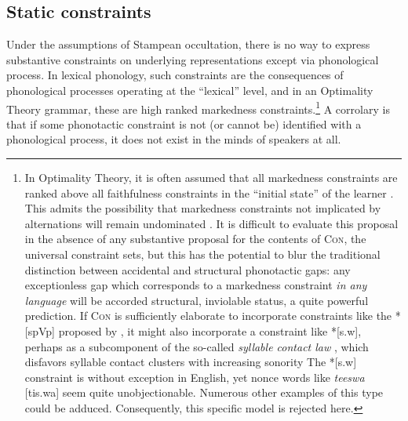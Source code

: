 \subsection{Static constraints}

Under the assumptions of Stampean occultation, there is no way to express substantive constraints on underlying representations except via phonological process.
In lexical phonology, such constraints are the consequences of phonological processes operating at the ``lexical'' level, and in an Optimality Theory grammar, these are high ranked markedness constraints.\footnote{In Optimality Theory, it is often assumed that all markedness constraints are ranked above all faithfulness constraints in the ``initial state'' of the learner \citep[e.g.,][]{Smolensky1996a}.
    This admits the possibility that markedness constraints not implicated by alternations will remain undominated \citep[e.g.,][]{Coetzee2008b}.
    It is difficult to evaluate this proposal in the absence of any substantive proposal for the contents of \textsc{Con}, the universal constraint sets, but this has the potential to blur the traditional distinction between accidental and structural phonotactic gaps: any exceptionless gap which corresponds to a markedness constraint \emph{in any language} will be accorded structural, inviolable status, a quite powerful prediction.
    If \textsc{Con} is sufficiently elaborate to incorporate constraints like the *[spVp] proposed by \citet{Coetzee2008b}, it might also incorporate a constraint like *[s.w], perhaps as a subcomponent of the so-called \emph{syllable contact law} \citep[e.g.,][]{Gouskova2004,Murray1983}, which disfavors syllable contact clusters with increasing sonority 
    The *[s.w] constraint is without exception in English, yet nonce words like \emph{teeswa} [tis.wa] seem quite unobjectionable.
    Numerous other examples of this type could be adduced.
    Consequently, this specific model is rejected here.}
A corrolary is that if some phonotactic constraint is not (or cannot be) identified with a phonological process, it does not exist in the minds of speakers at all.

